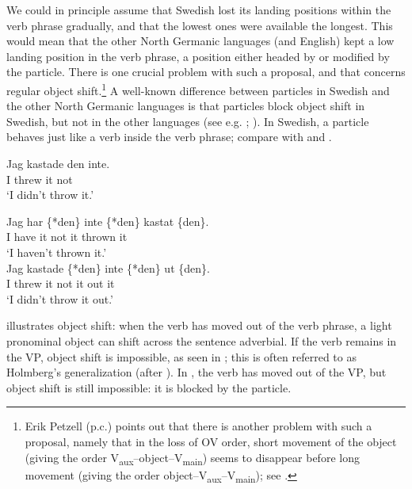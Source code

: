 \documentclass[output=paper]{langscibook}
\begin{document}
We could in principle assume that Swedish lost its landing positions within the verb phrase gradually, and that the lowest ones were available the longest. This would mean that the other North Germanic languages (and English) kept a low landing position in the verb phrase, a position either headed by or modified by the particle. There is one crucial problem with such a proposal, and that concerns regular object shift.\footnote{Erik Petzell (p.c.) points out that there is another problem with such a proposal, namely that in the loss of OV order, short movement of the object (giving the order V\textsubscript{aux}–object--V\textsubscript{main}) seems to disappear before long movement (giving the order object--V\textsubscript{aux}–V\textsubscript{main}); see \citet{Petzell2012}.} A well-known difference between particles in Swedish and the other North Germanic languages is that particles block object shift in Swedish, but not in the other languages (see e.g. \citealt{Holmberg1986}; \citealt{Sells1998}). In Swedish, a particle behaves just like a verb inside the verb phrase; compare  with  and .


\ea\label{ex:lalu:47}
\ea\label{ex:lalu:47a}
\gll  Jag   kastade   den   inte.\\
 I       threw   it     not\\
\glt `I didn’t throw it.'

\ex\label{ex:lalu:47b}
\gll Jag    har   \{*den\}  inte   \{*den\}   kastat   \{den\}.\\
    I       have     it    not     it     thrown     it\\
\glt `I haven’t thrown it.’\\
\ex\label{ex:lalu:47c}
\gll Jag  kastade   \{*den\}   inte   \{*den\}   ut     \{den\}.\\
    I     threw       it      not     it      out     it      \\
\glt `I didn’t throw it out.'
\z
\z


 illustrates object shift: when the verb has moved out of the verb phrase, a light pronominal object can shift across the sentence adverbial. If the verb remains in the VP, object shift is impossible, as seen in ; this is often referred to as Holmberg’s generalization (after \citealt{Holmberg1986}). In , the verb has moved out of the VP, but object shift is still impossible: it is blocked by the particle.
\end{document}
